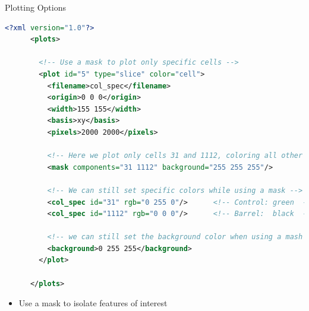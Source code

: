 
\begin{frame}[fragile]{Plotting Options}

  \begin{scriptsize}
    \begin{lstlisting}[language=XML,gobble=4]
      <?xml version="1.0"?>
      <plots>
      
        <!-- Use a mask to plot only specific cells -->
        <plot id="5" type="slice" color="cell">
          <filename>col_spec</filename>
          <origin>0 0 0</origin>
          <width>155 155</width>
          <basis>xy</basis>
          <pixels>2000 2000</pixels>
          
          <!-- Here we plot only cells 31 and 1112, coloring all other cells white -->
          <mask components="31 1112" background="255 255 255"/>
          
          <!-- We can still set specific colors while using a mask -->
          <col_spec id="31" rgb="0 255 0"/>      <!-- Control: green  -->
          <col_spec id="1112" rgb="0 0 0"/>      <!-- Barrel:  black  -->
          
          <!-- we can still set the background color when using a mash -->
          <background>0 255 255</background>
        </plot>

      </plots>
    \end{lstlisting}
  \end{scriptsize}

  \begin{itemize}
    \item Use a mask to isolate features of interest
  \end{itemize}
  
  
\end{frame}
